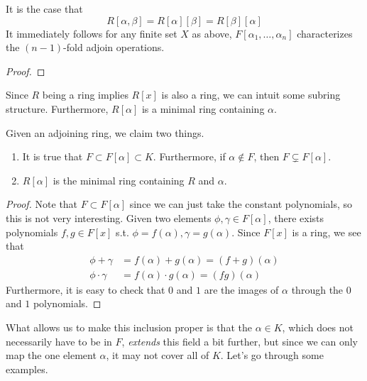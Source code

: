   \begin{lemma}
    It is the case that 
    \begin{equation}
      R[\alpha, \beta] = R[\alpha][\beta] = R[\beta][\alpha]
    \end{equation}
    It immediately follows for any finite set $X$ as above, $F[\alpha_1, \ldots, \alpha_n]$ characterizes the $(n-1)$-fold adjoin operations. 
  \end{lemma}
  \begin{proof}
    
  \end{proof}

  Since $R$ being a ring implies $R[x]$ is also a ring, we can intuit some subring structure. Furthermore, $R[\alpha]$ is a minimal ring containing $\alpha$. 

  \begin{lemma} 
    Given an adjoining ring, we claim two things. 
    \begin{enumerate}
      \item It is true that $F \subset F[\alpha] \subset K$. Furthermore, if $\alpha \not\in F$, then $F \subsetneq F[\alpha]$. 
      \item $R[\alpha]$ is the minimal ring containing $R$ and $\alpha$. 
    \end{enumerate}
  \end{lemma}
  \begin{proof}
    Note that $F \subset F[\alpha]$ since we can just take the constant polynomials, so this is not very interesting. Given two elements $\phi, \gamma \in F[\alpha]$, there exists polynomials $f, g \in F[x]$ s.t. $\phi = f(\alpha), \gamma = g(\alpha)$. Since $F[x]$ is a ring, we see that 
    \begin{align}
      \phi + \gamma & = f(\alpha) + g(\alpha) = (f + g)(\alpha) \\
      \phi \cdot \gamma & = f(\alpha) \cdot g(\alpha) = (fg)(\alpha)
    \end{align} 
    Furthermore, it is easy to check that $0$ and $1$ are the images of $\alpha$ through the $0$ and $1$ polynomials. 
  \end{proof} 

  What allows us to make this inclusion proper is that the $\alpha \in K$, which does not necessarily have to be in $F$, \textit{extends} this field a bit further, but since we can only map the one element $\alpha$, it may not cover all of $K$. Let's go through some examples. 

